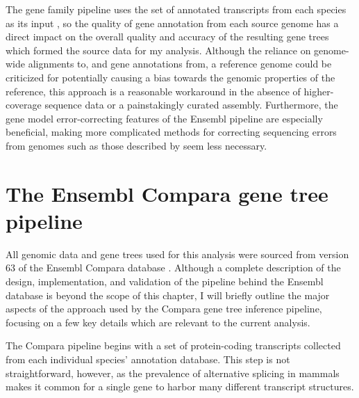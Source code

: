 The \cmp gene family pipeline uses the set of annotated transcripts
from each species as its input \citep{Vilella2009}, so the quality of
gene annotation from each source genome has a direct impact on the
overall quality and accuracy of the resulting gene trees which formed
the source data for my analysis. Although the reliance on genome-wide
alignments to, and gene annotations from, a reference genome could be
criticized for potentially causing a bias towards the genomic
properties of the reference, this approach is a reasonable workaround
in the absence of higher-coverage sequence data or a painstakingly
curated assembly. Furthermore, the gene model error-correcting
features of the Ensembl pipeline are especially beneficial, making
more complicated methods for correcting sequencing errors from \lcv
genomes such as those described by \citep{Hubisz2011} seem less
necessary.

\section{The Ensembl Compara gene tree pipeline}
\label{sec_compara_pipeline}

All genomic data and gene trees used for this analysis were sourced
from version 63 of the Ensembl Compara database
\citep{Vilella2009,Flicek2011}. Although a complete description of the
design, implementation, and validation of the pipeline behind the
Ensembl database is beyond the scope of this chapter, I will briefly
outline the major aspects of the approach used by the Compara gene
tree inference pipeline, focusing on a few key details which are
relevant to the current analysis.

The Compara pipeline begins with a set of protein-coding transcripts
collected from each individual species' annotation database. This step
is not straightforward, however, as the prevalence of alternative
splicing in \euth mammals makes it common for a single gene to harbor
many different transcript structures.


